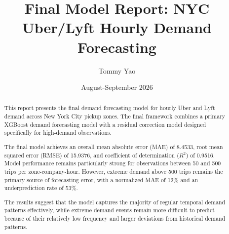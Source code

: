 \documentclass[11pt]{article}
\title{\textbf{Final Model Report: NYC Uber/Lyft Hourly Demand Forecasting}}
\author{Tommy Yao}
\date{August-September 2026}
\begin{document}
\maketitle

\begin{abstract}

This report presents the final demand forecasting model for hourly
Uber and Lyft demand across New York City pickup zones. The final
framework combines a primary XGBoost demand forecasting model with
a residual correction model designed specifically for high-demand
observations.

The final model achieves an overall mean absolute error (MAE) of
8.4533, root mean squared error (RMSE) of 15.9376, and coefficient
of determination ($R^2$) of 0.9516. Model performance remains
particularly strong for observations between 50 and 500 trips per
zone-company-hour. However, extreme demand above 500 trips remains
the primary source of forecasting error, with a normalized MAE of
12\% and an underprediction rate of 53\%.

The results suggest that the model captures the majority of regular
temporal demand patterns effectively, while extreme demand events
remain more difficult to predict because of their relatively low
frequency and larger deviations from historical demand patterns.

\end{abstract}
\end{document}
